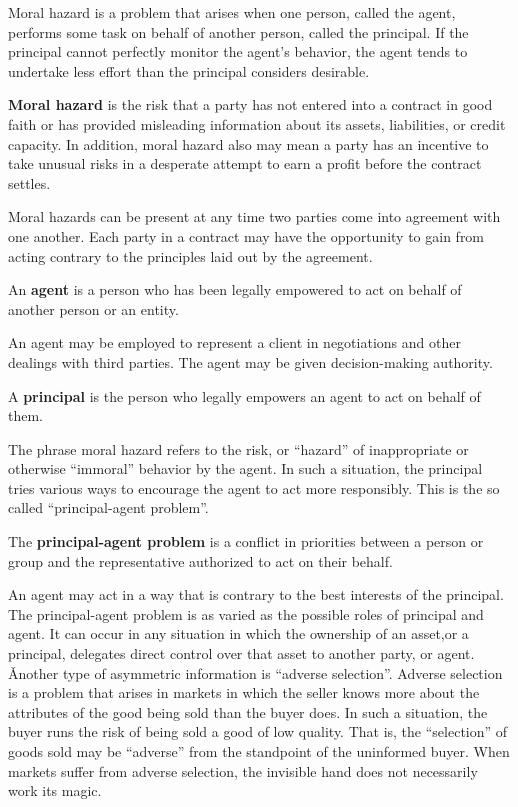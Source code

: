 Moral hazard is a problem that arises when one person, called the agent, performs some task on behalf of another
person, called the principal. If the principal cannot perfectly monitor the agent's behavior, the agent tends to
undertake less effort than the principal considers desirable.

\textbf{Moral hazard} is the risk that a party has not entered into a contract in good faith or has provided
misleading information about its assets, liabilities, or credit capacity. In addition, moral hazard also may mean a
party has an incentive to take unusual risks in a desperate attempt to earn a profit before the contract settles.
\ed

Moral hazards can be present at any time two parties come into agreement with one another. Each party in a contract
may have the opportunity to gain from acting contrary to the principles laid out by the agreement.

\bd[Agent]
An \textbf{agent} is a person who has been legally empowered to act on behalf of another person or an entity.
\ed

An agent may be employed to represent a client in negotiations and other dealings with third parties. The agent may
be given decision-making authority.

\bd[Principal]
A \textbf{principal} is the person who legally empowers an agent to act on behalf of them.
\ed

The phrase moral hazard refers to the risk, or ``hazard'' of inappropriate or otherwise ``immoral'' behavior by the
agent. In such a situation, the principal tries various ways to encourage the agent to act more responsibly. This is
the so called ``principal-agent problem''.

The \textbf{principal-agent problem} is a conflict in priorities between a person or group and the representative
authorized to act on their behalf.
\ed

An agent may act in a way that is contrary to the best interests of the principal. The principal-agent problem is as
varied as the possible roles of principal and agent. It can occur in any situation in which the ownership of an
asset,or a principal, delegates direct control over that asset to another party, or agent. \v

Another type of asymmetric information is ``adverse selection''. Adverse selection is a problem that arises in
markets in which the seller knows more about the attributes of the good being sold than the buyer does. In such a
situation, the buyer runs the risk of being sold a good of low quality. That is, the ``selection'' of goods sold may
be ``adverse'' from the standpoint of the uninformed buyer. When markets suffer from adverse selection, the invisible
hand does not necessarily work its magic.

